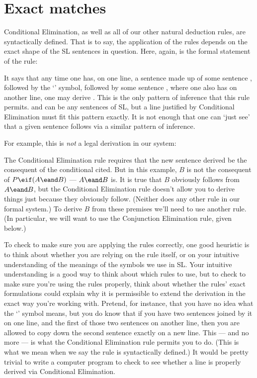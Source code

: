 \section{Exact matches}

Conditional Elimination, as well as all of our other natural deduction rules, are syntactically defined. That is to say, the application of the rules depends on the exact shape of the SL sentences in question. Here, again, is the formal statement of the rule:

\begin{ndproof}
	\metaA{}
	\metaB{} 
\end{ndproof}

It says that any time one has, on one line, a sentence made up of some sentence \metaA{}, followed by the `\eif' symbol, followed by some sentence \metaB{}, where one also has \metaA{} on another line, one may derive \metaB{}. This is the only pattern of inference that this rule permits. \metaA{} and \metaB{} can be any sentences of SL, but a line justified by Conditional Elimination must fit this pattern exactly. It is not enough that one can `just see' that a given sentence follows via a similar pattern of inference.

For example, this is \emph{not} a legal derivation in our system:

\begin{ndproof}
\end{ndproof}

The Conditional Elimination rule requires that the new sentence derived be the consequent of the conditional cited. But in this example, $B$ is not the consequent of $P\eif (A \eand B)$ --- $A \eand B$ is. It is true that $B$ obviously follows from $A \eand B$, but the Conditional Elimination rule doesn't allow you to derive things just because they obviously follow. (Neither does any other rule in our formal system.) To derive $B$ from these premises we'll need to use another rule. (In particular, we will want to use the Conjunction Elimination rule, given below.)

To check to make sure you are applying the rules correctly, one good heuristic is to think about whether you are relying on the rule itself, or on your intuitive understanding of the meanings of the symbols we use in SL. Your intuitive understanding is a good way to think about which rules to use, but to check to make sure you're using the rules properly, think about whether the rules' exact formulations could explain why it is permissible to extend the derivation in the exact way you're working with. Pretend, for instance, that you have no idea what the `\eif' symbol means, but you do know that if you have two sentences joined by it on one line, and the first of those two sentences on another line, then you are allowed to copy down the second sentence exactly on a new line. This --- and no more --- is what the Conditional Elimination rule permits you to do. (This is what we mean when we say the rule is syntactically defined.) It would be pretty trivial to write a computer program to check to see whether a line is properly derived via Conditional Elimination.

